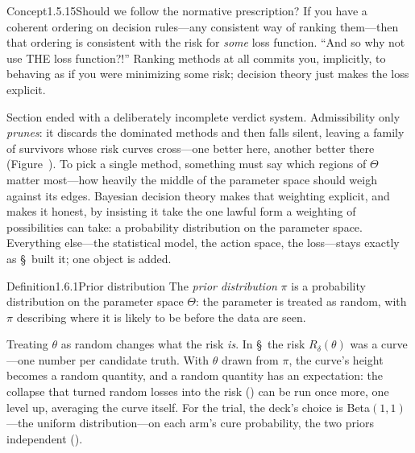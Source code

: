 \documentclass[main.tex]{subfiles}
\begin{document}
\begin{ObjL}{Concept}{1.5.15}{Should we follow the normative prescription?}
If you have a coherent ordering on decision rules---any consistent way of ranking them---then
that ordering is consistent with the risk for \emph{some} loss function. ``And so why not use
THE loss function?!'' Ranking methods at all commits you, implicitly, to behaving as if you
were minimizing some risk; decision theory just makes the loss explicit.
\end{ObjL}


Section  ended with a deliberately incomplete verdict system. Admissibility only
\emph{prunes}: it discards the dominated methods and then falls silent, leaving a family of
survivors whose risk curves cross---one better here, another better there
(Figure~). To pick a single method, something must say which regions of $\Theta$
matter most---how heavily the middle of the parameter space should weigh against its edges.
Bayesian decision theory makes that weighting explicit, and makes it honest, by insisting it
take the one lawful form a weighting of possibilities can take: a probability distribution on
the parameter space. Everything else---the statistical model, the action space, the
loss---stays exactly as \S\, built it; one object is added. 

\begin{Obj}{Definition}{1.6.1}{Prior distribution}
The \emph{prior distribution} $\pi$ is a probability distribution on the parameter space
$\Theta$: the parameter is treated as random, with $\pi$ describing where it is likely to be
before the data are seen.
\end{Obj}

\medskip
Treating $\theta$ as random changes what the risk \emph{is}. In \S\, the risk
$R_{\delta}(\theta)$ was a curve---one number per candidate truth. With $\theta$ drawn from
$\pi$, the curve's height becomes a random quantity, and a random quantity has an expectation:
the collapse that turned random losses into the risk () can be run once more, one
level up, averaging the curve itself. For the trial, the deck's choice is Beta$(1,1)$---the
uniform distribution---on each arm's cure probability, the two priors independent
().
\end{document}
